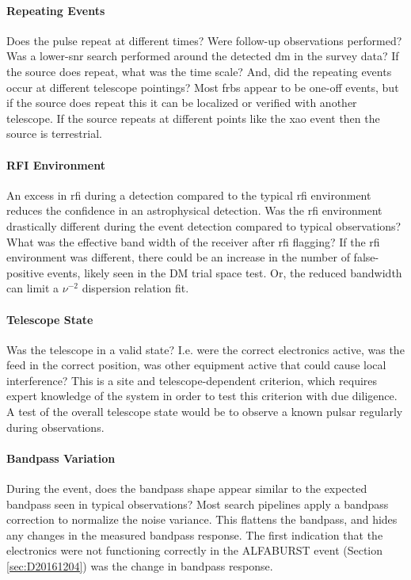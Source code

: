 \documentclass[a4paper,fleqn,usenatbib]{mnras}
\begin{document}
\paragraph{Repeating Events}

Does the pulse repeat at different times? Were follow-up observations performed?
Was a lower-\gls{snr} search performed around the detected \gls{dm} in the
survey data? If the source does repeat, what was the time scale? And, did the
repeating events occur at different telescope pointings? Most \glspl{frb} appear
to be one-off events, but if the source does repeat this it can be localized or
verified with another telescope. If the source repeats at different points like
the \gls{xao} event then the source is terrestrial.

\paragraph{RFI Environment}

An excess in \gls{rfi} during a detection compared to the typical \gls{rfi}
environment reduces the confidence in an astrophysical detection.  Was the
\gls{rfi} environment drastically different during the event detection compared
to typical observations? What was the effective band width of the receiver after
\gls{rfi} flagging? If the \gls{rfi} environment was different, there could be
an increase in the number of false-positive events, likely seen in the DM trial
space test. Or, the reduced bandwidth can limit a $\nu^{-2}$ dispersion relation
fit.

\paragraph{Telescope State}

Was the telescope in a valid state? I.e. were the correct electronics active,
was the feed in the correct position, was other equipment active that could
cause local interference? This is a site and telescope-dependent criterion,
which requires expert knowledge of the system in order to test this criterion
with due diligence.  A test of the overall telescope state would be to observe a
known pulsar regularly during observations.

\paragraph{Bandpass Variation}

During the event, does the bandpass shape appear similar to the expected
bandpass seen in typical observations? Most search pipelines apply a bandpass
correction to normalize the noise variance. This flattens the bandpass, and
hides any changes in the measured bandpass response. The first indication that
the electronics were not functioning correctly in the ALFABURST event (Section
\ref{sec:D20161204}) was the change in bandpass response.
\end{document}

